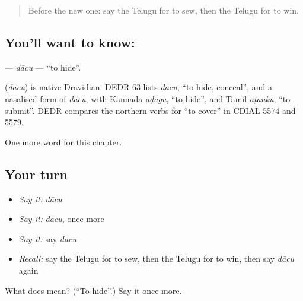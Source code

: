 \begin{quote}
Before the new one: say the Telugu for to sew, then the Telugu for to win.
\end{quote}

\subsection*{You'll want to know: }
\textbf{} — \emph{dācu} — \textquotedblleft{}to hide\textquotedblright{}.

\begin{cousinweb}
\textbf{} (\emph{dācu}) is native Dravidian. DEDR 63 lists \emph{ḍācu}, \textquotedblleft{}to hide, conceal\textquotedblright{}, and a nasalised form of \emph{dācu}, with Kannada \emph{aḍagu}, \textquotedblleft{}to hide\textquotedblright{}, and Tamil \emph{aṭaṅku}, \textquotedblleft{}to submit\textquotedblright{}. DEDR compares the northern verbs for \textquotedblleft{}to cover\textquotedblright{} in CDIAL 5574 and 5579.
\end{cousinweb}

\begin{grammarlens}[title={What you've built}]
One more word for this chapter.
\end{grammarlens}

\subsection*{Your turn}
\begin{itemize}
\raggedright
  \item \emph{Say it:} \emph{dācu}
  \item \emph{Say it:} \emph{dācu}, once more
  \item \emph{Say it:} say \emph{dācu}
  \item \emph{Recall:} say the Telugu for to sew, then the Telugu for to win, then say \emph{dācu} again
\end{itemize}

\begin{tcolorbox}[breakable,colback=teal!4,colframe=teal!35!black,title={Before you move on}]
What does  mean? (\textquotedblleft{}To hide\textquotedblright{}.) Say it once more.
\end{tcolorbox}
